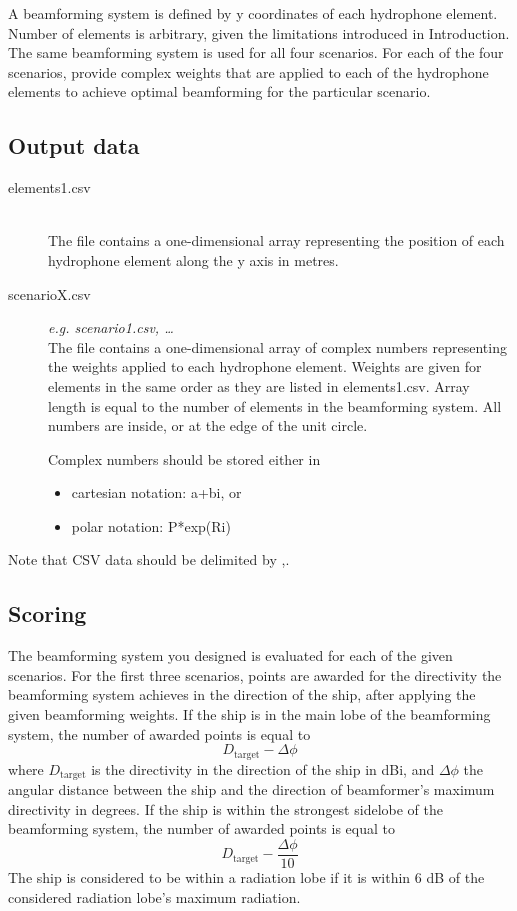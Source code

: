 \documentclass{article}[a4paper]
\begin{document}
A beamforming system is defined by y coordinates of each hydrophone element. Number of elements is arbitrary, given the limitations introduced in Introduction. The same beamforming system is used for all four scenarios. For each of the four scenarios, provide complex weights that are applied to each of the hydrophone elements to achieve optimal beamforming for the particular scenario.

\subsection*{Output data}

\begin{description}
	\item[elements1.csv] \,\\ The file contains a one-dimensional array representing the position of each hydrophone element along the y axis in metres.
	
	\item[scenarioX.csv] \textit{e.g. scenario1.csv, \ldots}\,\\ The file contains a one-dimensional array of complex numbers representing the weights applied to each hydrophone element. Weights are given for elements in the same order as they are listed in \textsf{elements1.csv}. Array length is equal to the number of elements in the beamforming system. All numbers are inside, or at the edge of the unit circle.
	
	Complex numbers should be stored either in
	\begin{itemize}
		\item cartesian notation: \textsf{a+bi}, or
		\item polar notation: \textsf{P*exp(Ri)}
	\end{itemize}
\end{description}

Note that CSV data should be delimited by \textsf{,}.

\subsection*{Scoring}

The beamforming system you designed is evaluated for each of the given scenarios. For the first three scenarios, points are awarded for the directivity the beamforming system achieves in the direction of the ship, after applying the given beamforming weights. If the ship is in the main lobe of the beamforming system, the number of awarded points is equal to
\[ D_\textrm{target} - \varDelta \phi \]
where $D_\textrm{target}$ is the directivity in the direction of the ship in dBi, and $\varDelta \phi$ the angular distance between the ship and the direction of beamformer's maximum directivity in degrees. If the ship is within the strongest sidelobe of the beamforming system, the number of awarded points is equal to
\[ D_\textrm{target} - \dfrac{\varDelta \phi}{10} \]
The ship is considered to be within a radiation lobe if it is within 6 dB of the considered radiation lobe's maximum radiation.
\end{document}
